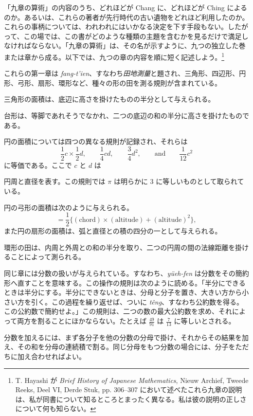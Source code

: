 \documentclass[11pt]{article}
\newcommand{\scanpage}[2]{\clearpage\setcounter{footnote}{0}\noindent{\footnotesize\color{gray}PDF #1 頁 · #2}\par\medskip}
\newcommand{\scanfooter}{}
\begin{document}
「九章の算術」の内容のうち、どれほどが Chang に、どれほどが Ching によるのか。あるいは、これらの著者が先行時代の古い遺物をどれほど利用したのか。これらの事柄については、われわれにはいかなる決定を下す手段もない。したがって、この場では、この書がどのような種類の主題を含むかを見るだけで満足しなければならない。「九章の算術」は、その名が示すように、九つの独立した巻または章から成る。以下では、九つの章の内容を順に短く記述しよう。\footnote{T. Hayashi が \emph{Brief History of Japanese Mathematics}, Nieuw Archief, Tweede Reeks, Deel VI, Derde Stuk, pp. 306--307 において述べたこれら九章の説明は、私が同書について知るところとまったく異なる。私は彼の説明の正しさについて何も知らない。}

これらの第一章は \emph{fang-t'ien}、すなわち\emph{田地測量}と題され、三角形、四辺形、円形、弓形、扇形、環形など、種々の形の田を測る規則が含まれている。

三角形の面積は、底辺に高さを掛けたものの半分として与えられる。

台形は、等脚であれそうでなかれ、二つの底辺の和の半分に高さを掛けたものである。

円の面積については四つの異なる規則が記録され、それらは
\[
\frac12 c\times \frac12 d,\qquad \frac14 cd,\qquad \frac34 d^2,\qquad \text{and}\qquad \frac1{12}c^2
\]
に等価である。ここで $c$ と $d$ は
\scanfooter

\scanpage{0025}{第三章、印刷頁11}
円周と直径を表す。この規則では $\pi$ は明らかに 3 に等しいものとして取られている。

円の弓形の面積は次のように与えられる。
\[
=\frac12\{(\text{chord})\times(\text{altitude})+(\text{altitude})^2\},
\]
また円の扇形の面積は、弧と直径との積の四分の一として与えられる。

環形の田は、内周と外周との和の半分を取り、二つの円周の間の法線距離を掛けることによって測られる。

同じ章には分数の扱いが与えられている。すなわち、\emph{yüeh-fen} は分数をその簡約形へ直すことを意味する。この操作の規則は次のように読める。「半分にできるときは半分にする。半分にできないときは、分母と分子を置き、大きい方から小さい方を引く。この過程を繰り返せば、ついに \emph{têng}、すなわち公約数を得る。この公約数で簡約せよ。」この規則は、二つの数の最大公約数を求め、それによって両方を割ることにほかならない。たとえば $\frac{49}{91}$ は $\frac{7}{13}$ に等しいとされる。

分数を加えるには、まず各分子を他の分数の分母で掛け、それからその結果を加え、その和を分母の連続積で割る。同じ分母をもつ分数の場合には、分子をただちに加え合わせればよい。
\end{document}
